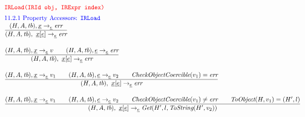 \[
\begin{array}{l@{~~}l@{~~}ll}
\mtt{\normalsize\inred IRLoad(IRId obj, IRExpr index)}\\[.5em]
\mbox{\inblue 11.2.1 Property Accessors: {\tt IRLoad}}\\

\frac{\begin{matrix}
\evale, \irid \rightarrow_{\ir\expr} \err
\end{matrix}}{\begin{matrix}
\state, \ \irid{\tt[}\ir\expr{\tt]} \rightarrow_{\ir\expr}
\err
\end{matrix}}
\\[2em]

\frac{\begin{matrix}
\evale, \irid \rightarrow_{\ir\expr} v
\rulesep
\evale, \ir\expr \rightarrow_{\ir\expr} \err
\end{matrix}}{\begin{matrix}
\state, \ \irid{\tt[}\ir\expr{\tt]} \rightarrow_{\ir\expr}
\err
\end{matrix}}
\\[2em]

\frac{\begin{matrix}
\evale, \irid \rightarrow_{\ir\expr} v_1
\rulesep
\evale, \ir\expr \rightarrow_{\ir\expr} v_2
\rulesep
\hf{CheckObjectCoercible}(v_1) = \err
\end{matrix}}{\begin{matrix}
\state, \ \irid{\tt[}\ir\expr{\tt]} \rightarrow_{\ir\expr}
\err
\end{matrix}}
\\[2em]

\frac{\begin{matrix}
\evale, \irid \rightarrow_{\ir\expr} v_1
\rulesep
\evale, \ir\expr \rightarrow_{\ir\expr} v_2
\rulesep
\hf{CheckObjectCoercible}(v_1) \not= \err
\rulesep
\hf{ToObject}(H, v_1) = (H',l)
\end{matrix}}{\begin{matrix}
\state, \ \irid{\tt[}\ir\expr{\tt]} \rightarrow_{\ir\expr}
\hf{Get}(H', l, \hf{ToString}(H', v_2))
\end{matrix}}
\\[2em]



\end{array}\]
